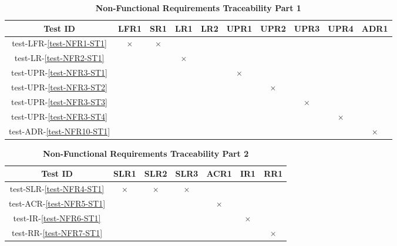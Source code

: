 \documentclass[12pt, titlepage]{article}
\begin{document}
\begin{table}[H]
\centering
\begin{tabular}{|c|c|c|c|c|c|c|c|c|c|}
\hline
Test ID & LFR1 & SR1 & LR1 & LR2 & UPR1 & UPR2 & UPR3 & UPR4 & ADR1 \\
\hline
test-LFR-\ref{test-NFR1-ST1} & $\times$ & $\times$  & & & & & & & \\
\hline
test-LR-\ref{test-NFR2-ST1} & & & $\times$ & & & & & &  \\
\hline
test-UPR-\ref{test-NFR3-ST1} & & & & & $\times$ & & & & \\
\hline
test-UPR-\ref{test-NFR3-ST2} & & & & & & $\times$ & & & \\
\hline
test-UPR-\ref{test-NFR3-ST3} & & & & & & & $\times$ & & \\
\hline
test-UPR-\ref{test-NFR3-ST4} & & & & & & & & $\times$ & \\
\hline
test-ADR-\ref{test-NFR10-ST1} & & & & & & & & & $\times$\\
\hline
\end{tabular}
\caption{\bf Non-Functional Requirements Traceability Part 1}
\end{table}

\begin{table}[H]
\centering
\begin{tabular}{|c|c|c|c|c|c|c|}
\hline
Test ID & SLR1 & SLR2 & SLR3 & ACR1 & IR1 & RR1 \\
\hline 
test-SLR-\ref{test-NFR4-ST1} & $\times$ & $\times$ & $\times$ & & &\\
\hline
test-ACR-\ref{test-NFR5-ST1} & & & & $\times$ & &\\
\hline
test-IR-\ref{test-NFR6-ST1} & & & & & $\times$ &\\
\hline
test-RR-\ref{test-NFR7-ST1} & & & & & & $\times$\\
\hline
\end{tabular}
\caption{\bf Non-Functional Requirements Traceability Part 2}
\end{table}
		
\end{document}
